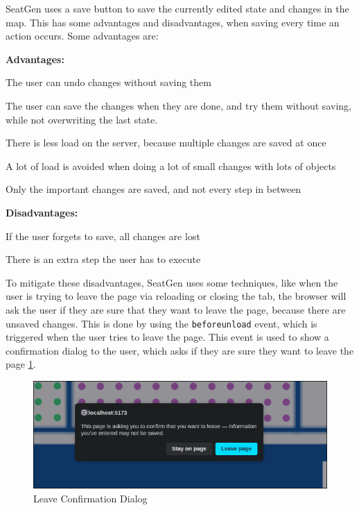SeatGen uses a save button to save the currently edited state and changes in the map. This has some advantages and disadvantages, when saving every time an action occurs. Some advantages are:

\textbf{Advantages:}
\begin{compactitem}
    \item The user can undo changes without saving them
    \item The user can save the changes when they are done, and try them without saving, while not overwriting the last state.
    \item There is less load on the server, because multiple changes are saved at once
    \item A lot of load is avoided when doing a lot of small changes with lots of objects
    \item Only the important changes are saved, and not every step in between
\end{compactitem}

\textbf{Disadvantages:}
\begin{compactitem}
\item If the user forgets to save, all changes are lost
\item There is an extra step the user has to execute
\end{compactitem}

To mitigate these disadvantages, SeatGen uses some techniques, like when the user is trying to leave the page via reloading or closing the tab, the browser will ask the user if they are sure that they want to leave the page, because there are unsaved changes. This is done by using the \texttt{beforeunload} event, which is triggered when the user tries to leave the page. This event is used to show a confirmation dialog to the user, which asks if they are sure they want to leave the page \ref{fig:save-button}.

\begin{figure}
    \centering
    \includegraphics[scale=0.5]{pics/save-button.png}
    \caption{Leave Confirmation Dialog}
    \label{fig:save-button}
\end{figure}

